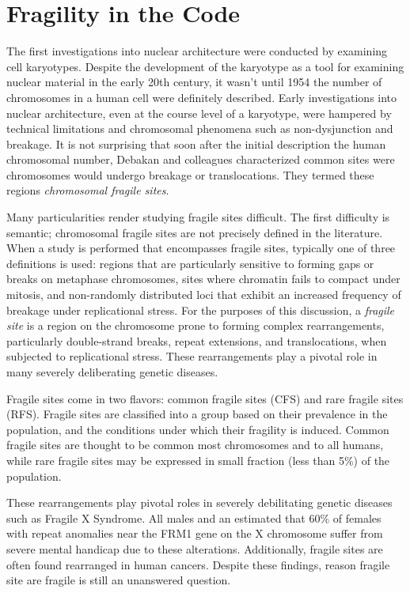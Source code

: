 \chapter{Fragility in the Code}

The first investigations into nuclear architecture were conducted by
examining cell karyotypes.  Despite the development of the karyotype as a
tool for examining nuclear material in the early 20th
century\cite{levitsky1924}, it wasn't until 1954 the number of chromosomes in
a human cell were definitely described\cite{tjio1956}.  Early investigations
into nuclear architecture, even at the course level of a karyotype, were
hampered by technical limitations and chromosomal phenomena such as
non-dysjunction and breakage.  It is not surprising that soon after the
initial description the human chromosomal number, Debakan and colleagues
characterized common sites were chromosomes would undergo breakage or
translocations.  They termed these regions
\textit{chromosomal fragile sites}\cite{leyden2008}.

Many particularities render studying fragile sites difficult.  The
first difficulty is semantic; chromosomal fragile sites are not precisely
defined in the literature.  When a study is performed that encompasses fragile
sites, typically one of three definitions is used: regions that are particularly
sensitive to forming gaps or breaks on metaphase chromosomes\cite{glover2005},
sites where chromatin fails to compact under mitosis\cite{leyden2008}, and
non-randomly distributed loci that exhibit an increased frequency of breakage
under replicational stress\cite{franchitto2013}.  For the purposes of this
discussion, a \textit{fragile site} is a region on the chromosome prone to
forming complex rearrangements, particularly double-strand breaks, repeat
extensions, and translocations, when subjected to replicational stress.  These
rearrangements play a pivotal role in many severely deliberating genetic
diseases.

Fragile sites come in two flavors: common fragile sites (CFS) and rare fragile
sites (RFS).  Fragile sites are classified into a group based on their
prevalence in the population, and the conditions under which their fragility
is induced\cite{leyden2008}.  Common fragile sites are thought to be common
most chromosomes and to all humans, while rare fragile sites may be expressed
in small fraction (less than 5\%) of the population\cite{wells2006}.

These
rearrangements play pivotal roles in severely debilitating genetic diseases
such as Fragile X Syndrome.  All males and an estimated that 60\% of females
with repeat anomalies near the FRM1 gene on the X chromosome suffer
from severe mental handicap due to these alterations\cite{sutherland1995}.
Additionally, fragile sites are often found rearranged in human
cancers\cite{glover2005}.  Despite these findings, reason fragile site are
fragile is still an unanswered question.

